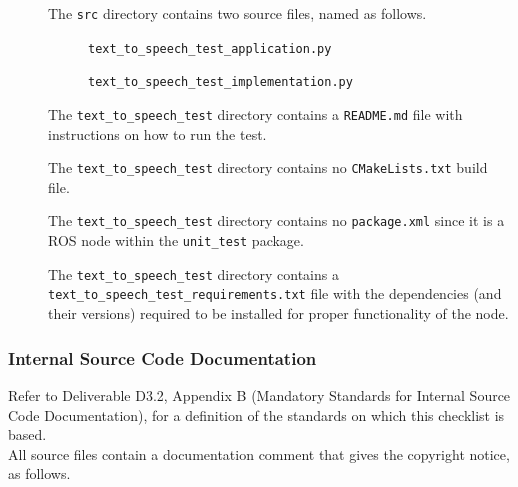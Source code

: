 \documentclass{CSSRforAfrica}
\newcommand{\checkboxChecked}{\fbox{\ding{51}}} %
\newcommand{\checkboxDashed}{\fbox{--}}         %
\begin{document}
\begin{description}
\item[\checkboxChecked] The  {\small \verb+src+} directory contains two source files, named as follows.
\begin{description}
\item[\checkboxChecked] {\small \verb+text_to_speech_test_application.py+}  
\item[\checkboxChecked]  {\small \verb+text_to_speech_test_implementation.py+}  
\end{description}

\item[\checkboxChecked] The {\small \verb+text_to_speech_test+} directory contains  a {\small \verb+README.md+} file with  instructions on how to run the test.

\item[\checkboxChecked] The {\small \verb+text_to_speech_test+} directory contains no {\small \verb+CMakeLists.txt+} build file.

\item[\checkboxChecked] The {\small \verb+text_to_speech_test+} directory contains no {\small \verb+package.xml+} since it is a ROS node within the {\small \verb+unit_test+} package.

\item[\checkboxDashed] The {\small \verb+text_to_speech_test+} directory contains a {{\small \texttt{text\_to\_speech\_test\_requirements.txt}}} file with  the dependencies (and their versions) required to be installed for proper functionality of the node.

\end{description}

\subsubsection{Internal Source Code Documentation}

Refer to Deliverable D3.2, Appendix B (Mandatory Standards for Internal Source Code Documentation), for a definition of the standards on which this checklist is based.\\

\noindent All source files contain a documentation comment that gives the copyright notice, as follows.
\end{document}
